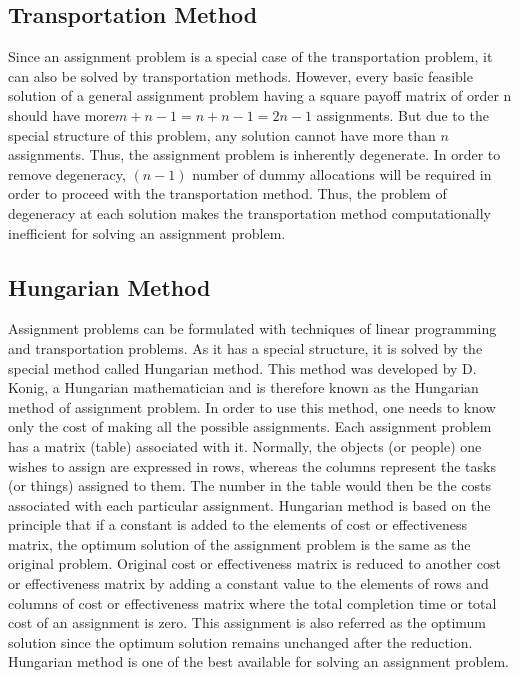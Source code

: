 \documentclass[11pt]{report}
\begin{document}
	\subsection{Transportation Method}
	Since an assignment problem is a special case of the transportation problem, it can also be solved
	by transportation methods. However, every basic feasible solution of a general assignment problem having a square payoff matrix of order n should have more$ m+n-1= n+n-1=2n-1$
	assignments. But due to the special structure of this problem, any solution cannot have more than $n$ assignments. Thus, the assignment problem is inherently degenerate. In order to remove degeneracy, $(n-1)$ number of dummy allocations will be required in order to proceed with the
	transportation method. Thus, the problem of degeneracy at each solution makes the transportation method computationally inefficient for solving an assignment problem.
	
	\subsection{Hungarian Method}
	Assignment problems can be formulated with techniques of linear programming and transportation problems. As it has a special structure, it is solved by the special method called Hungarian method. This method was developed by D. Konig, a Hungarian mathematician and is therefore known as the Hungarian method of assignment problem. In order to use this method, one needs to know only the cost of making all the possible assignments. Each assignment problem has a matrix (table) associated with it. Normally, the objects (or people) one wishes to assign are expressed in rows, whereas the columns represent the tasks (or things) assigned to them. The number in the table would then be the costs associated with each particular assignment. Hungarian method is based on the principle that if a constant is added to the elements of cost or effectiveness matrix, the optimum solution of the assignment problem is the same as the original problem. Original cost or effectiveness matrix is reduced to another cost or effectiveness matrix by adding a constant value
	to the elements of rows and columns of cost or effectiveness matrix where the total completion time or total cost of an assignment is zero. This assignment is also referred as the optimum solution since the optimum solution remains unchanged after the reduction. Hungarian method is one of the best available for solving an assignment problem.
	
\end{document}
